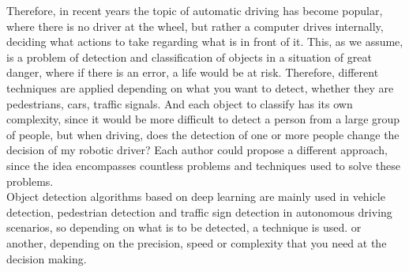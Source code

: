 Therefore, in recent years the topic of automatic driving has become popular,
where there is no driver at the wheel, but rather a computer drives internally,
deciding what actions to take regarding what is in front of it. This, as we
assume, is a problem of detection and classification of objects in a situation
of great danger, where if there is an error, a life would be at risk. Therefore,
different techniques are applied depending on what you want to detect, whether
they are pedestrians, cars, traffic signals. And each object to classify has its
own complexity, since it would be more difficult to detect a person from a large
group of people, but when driving, does the detection of one or more people
change the decision of my robotic driver? Each author could propose a different
approach, since the idea encompasses countless problems and techniques used to
solve these problems. \\

Object detection algorithms based on deep learning are mainly used in vehicle
detection, pedestrian detection and traffic sign detection in autonomous driving
scenarios, so depending on what is to be detected, a technique is used. or
another, depending on the precision, speed or complexity that you need at the
decision making.